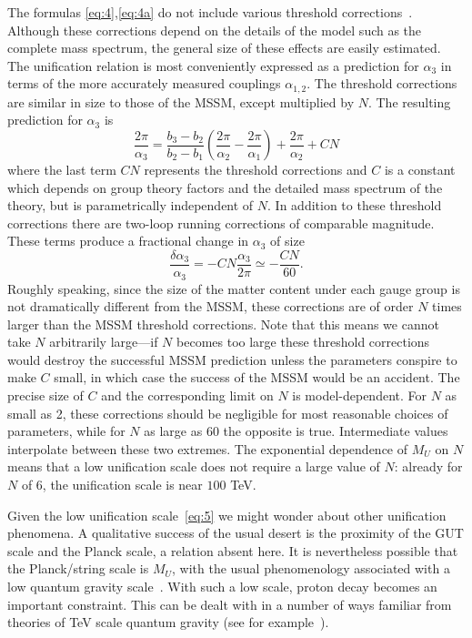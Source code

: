 \documentclass[a4paper,prl,twocolumn]{revtex4}
\begin{document}
The formulas \eqref{eq:4},\eqref{eq:4a} do not include various threshold
corrections~\cite{Hall:1981kf}. Although these corrections depend on
the details of the model such as the complete mass spectrum, the
general size of these effects are easily estimated. The unification
relation is most conveniently expressed as a prediction for $\alpha_3$
in terms of the more accurately measured couplings $\alpha_{1,2}$. The
threshold corrections are similar in size to those of the MSSM, except
multiplied by $N$. The resulting prediction for $\alpha_3$ is
\begin{equation}
  \label{eq:9}
  \frac{2\pi}{\alpha_3} = \frac{b_3 -b_2}{b_2-b_1}
  \left(\frac{2\pi}{\alpha_2}- \frac{2\pi}{\alpha_1}\right) +
  \frac{2\pi}{\alpha_2} + C N 
\end{equation}
where the last term $C N$ represents the threshold corrections and $C$
is a constant which depends on group theory factors and the detailed
mass spectrum of the theory, but is parametrically independent of $N$.
In addition to these threshold corrections there are two-loop running
corrections of comparable magnitude.  
These  terms produce a fractional change in $\alpha_3$ of
size
\begin{equation}
  \label{eq:10}
  \frac{\delta \alpha_3}{\alpha_3} = - C N \frac{\alpha_3}{2\pi}
  \simeq -\frac{C N}{60}.
\end{equation}
Roughly speaking, since the size of the matter content under each
gauge group is not dramatically different from the MSSM, these
corrections are of order $N$ times larger than the MSSM threshold
corrections.  Note that this means we cannot take $N$ arbitrarily
large---if $N$ becomes too large these threshold corrections would
destroy the successful MSSM prediction unless the parameters conspire
to make $C$ small, in which case the success of the MSSM would be an
accident.  The precise size of $C$ and the corresponding limit on $N$
is model-dependent.  For $N$ as small as 2, these corrections should
be negligible for most reasonable choices of parameters, while for $N$
as large as 60 the opposite is true.  Intermediate values interpolate
between these two extremes.  The exponential dependence of $M_U$ on
$N$ means that a low unification scale does not require a large
value of $N$: already for $N$ of 6, the unification scale is near
$100$ TeV.

Given the low unification scale~\eqref{eq:5} we might wonder about
other unification phenomena. A qualitative success of the usual desert
is the proximity of the GUT scale and the Planck scale, a relation
absent here. It is nevertheless possible that the Planck/string scale
is $M_U$, with the usual phenomenology associated with a low quantum
gravity scale~\cite{Arkani-Hamed:1998rs}.  With such a low scale,
proton decay becomes an important constraint.  This can be dealt with
in a number of ways familiar from theories of TeV scale quantum
gravity (see for example~\cite{Arkani-Hamed:1999dc}).
\end{document}
